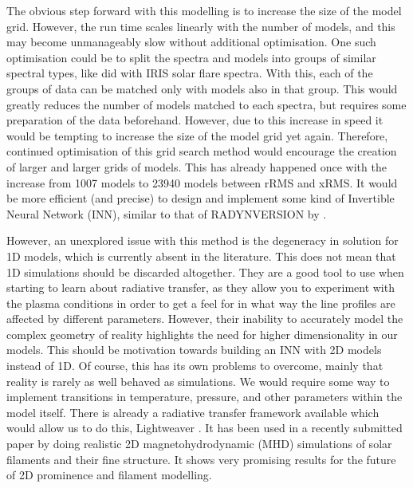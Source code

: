 The obvious step forward with this modelling is to increase the size of the model grid. However, the run time scales linearly with the number of models, and this may become unmanageably slow without additional optimisation. One such optimisation could be to split the spectra and models into groups of similar spectral types, like \cite{panos_identifying_2018} did with IRIS solar flare spectra. With this, each of the groups of data can be matched only with models also in that group. This would greatly reduces the number of models matched to each spectra, but requires some preparation of the data beforehand. However, due to this increase in speed it would be tempting to increase the size of the model grid yet again. Therefore, continued optimisation of this grid search method would encourage the creation of larger and larger grids of models. This has already happened once with the increase from 1007 models to 23940 models between rRMS and xRMS. It would be more efficient (and precise) to design and implement some kind of Invertible Neural Network (INN), similar to that of RADYNVERSION by \cite{osborne_radynversion_2019}.

However, an unexplored issue with this method is the degeneracy in solution for 1D models, which is currently absent in the literature. This does not mean that 1D simulations should be discarded altogether. They are a good tool to use when starting to learn about radiative transfer, as they allow you to experiment with the plasma conditions in order to get a feel for in what way the line profiles are affected by different parameters. However, their inability to accurately model the complex geometry of reality highlights the need for higher dimensionality in our models. This should be motivation towards building an INN with 2D models instead of 1D. Of course, this has its own problems to overcome, mainly that reality is rarely as well behaved as simulations. We would require some way to implement transitions in temperature, pressure, and other parameters within the model itself. There is already a radiative transfer framework available which would allow us to do this, Lightweaver \citep{osborne_lightweaver_2021}. It has been used in a recently submitted paper by \cite{jenkins_full_2022} doing realistic 2D magnetohydrodynamic (MHD) simulations of solar filaments and their fine structure. It shows very promising results for the future of 2D prominence and filament modelling.

